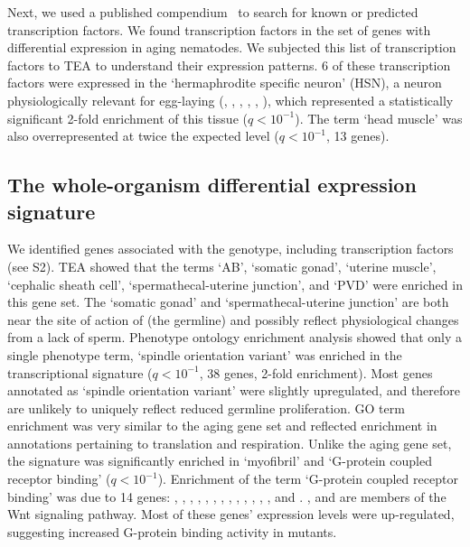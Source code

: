 Next, we used a published compendium~\citep{Reece-Hoyes2005} to search for known
or predicted transcription factors. We found \tfaging{} transcription factors in
the set of genes with differential expression in aging nematodes. We subjected
this list of transcription factors to TEA to understand their expression
patterns. 6 of these transcription factors were expressed in the `hermaphrodite
specific neuron' (HSN), a neuron physiologically relevant for egg-laying
(, , , , ,
), which represented a statistically significant 2-fold enrichment
of this tissue ($q<10^{-1}$). The term `head muscle' was also overrepresented at
twice the expected level ($q<10^{-1}$, 13 genes).

\subsection*{The whole-organism \fog{} differential expression signature}
We identified \fogn{} genes associated with the \fog{} genotype, including
\tffog{} transcription factors (see S2). TEA showed that the terms `AB',
`somatic gonad', `uterine muscle', `cephalic sheath cell', `spermathecal-uterine
junction', and `PVD' were enriched in this gene set. The `somatic gonad' and
`spermathecal-uterine junction' are both near the site of action of \fog{} (the
germline) and possibly reflect physiological changes from a lack of sperm.
Phenotype ontology enrichment analysis showed that only a single phenotype term,
`spindle orientation variant' was enriched in the \fog{} transcriptional
signature ($q<10^{-1}$, 38 genes, 2-fold enrichment). Most genes annotated as
`spindle orientation variant' were slightly upregulated, and therefore are
unlikely to uniquely reflect reduced germline proliferation. GO term enrichment
was very similar to the aging gene set and reflected enrichment in annotations
pertaining to translation and respiration. Unlike the aging gene set, the \fog{}
signature was significantly enriched in `myofibril' and `G-protein coupled
receptor binding' ($q<10^{-1}$). Enrichment of the term `G-protein coupled
receptor binding' was due to 14 genes: , ,
, , , , ,
, , , , ,
, and . ,  and 
are members of the Wnt signaling pathway. Most of these genes' expression levels
were up-regulated, suggesting increased G-protein binding activity in \fog{}
mutants.

